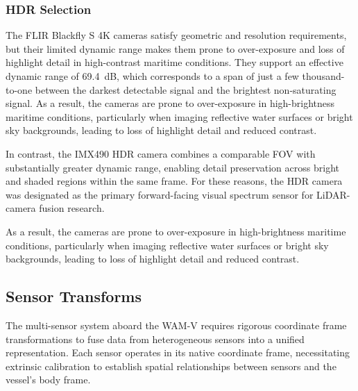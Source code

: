 




\subsubsection{HDR Selection}

The FLIR Blackfly S 4K cameras satisfy geometric and resolution requirements, but their limited dynamic range makes them prone to over-exposure and loss of highlight detail in high-contrast maritime conditions. 
They support an effective dynamic range of 69.4~dB, which corresponds to a span of just a few thousand-to-one between the darkest detectable signal and the brightest non-saturating signal. 
As a result, the cameras are prone to over-exposure in high-brightness maritime conditions, particularly when imaging reflective water surfaces or bright sky backgrounds, leading to loss of highlight detail and reduced contrast. 

In contrast, the IMX490 \ac{HDR} camera combines a comparable \ac{FOV} with substantially greater dynamic range, enabling detail preservation across bright and shaded regions within the same frame.  
For these reasons, the \ac{HDR} camera was designated as the primary forward-facing visual spectrum sensor for \ac{LiDAR}-camera fusion research.  
 
As a result, the cameras are prone to over-exposure in high-brightness maritime conditions, particularly when imaging reflective water surfaces or bright sky backgrounds, leading to loss of highlight detail and reduced contrast.  



        




\subsection{Sensor Transforms}
The multi-sensor system aboard the WAM-V requires rigorous coordinate frame transformations to fuse data from heterogeneous sensors into a unified representation. Each sensor operates in its native coordinate frame, necessitating extrinsic calibration to establish spatial relationships between sensors and the vessel's body frame.

